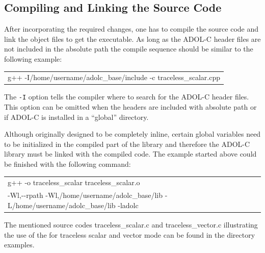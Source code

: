\documentclass[11pt,twoside]{article}
\begin{document}
\subsection{Compiling and Linking the Source Code}
%
After incorporating the required changes, one has to compile the
source code and link the object files to get the executable. 
As long as the ADOL-C header files are not included in the absolute path
the compile sequence should be similar to the following example:
\begin{center}
  \begin{tabular}{l}
    {\sf g++ -I/home/username/adolc\_base/include -c traceless\_scalar.cpp}
  \end{tabular}
\end{center}
The \verb#-I# option tells the compiler where to search for the ADOL-C
header files. This option can be omitted when the headers are included
with absolute path or if ADOL-C is installed in a ``global'' directory. 

Although originally designed to be completely inline, certain global
variables need to be initialized in the compiled part of the library
and therefore the ADOL-C library must be linked with the compiled code.
The example started above could be finished with the
following command:
\begin{center}
  \begin{tabular}{l}
    {\sf g++ -o traceless\_scalar traceless\_scalar.o}\\
    {\sf -Wl,-{}-rpath -Wl,/home/username/adolc\_base/lib -L/home/username/adolc\_base/lib -ladolc}
  \end{tabular}
\end{center}
The mentioned source codes {\sf traceless\_scalar.c} and {\sf traceless\_vector.c} 
illustrating the use of the for traceless scalar and vector mode can be found in
the directory {\sf examples}. 
%
\end{document}
